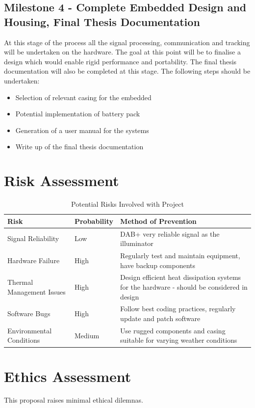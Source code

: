 \documentclass[12pt,a4paper]{article}
\begin{document}
\subsection{Milestone 4 - Complete Embedded Design and Housing, Final Thesis Documentation} 
At this stage of the process all the signal processing, communication and tracking will be undertaken on the hardware. The goal at this point will be to finalise a design which would enable rigid performance and portability. The final thesis documentation will also be completed at this stage. The following steps should be undertaken:
\begin{multicols}{2}
    \begin{itemize}
    \item Selection of relevant casing for the embedded
    \item Potential implementation of battery pack
    \item Generation of a user manual for the systems
    \item Write up of the final thesis documentation
    \end{itemize} 
\end{multicols}

\newpage
\section{Risk Assessment}

\begin{table}[htbp]
    \centering
    \caption{Potential Risks Involved with Project}
    \vspace{0.5cm}
    \begin{tabular}{|>{\raggedright\arraybackslash}p{3cm}|p{3cm}|p{6cm}|}
    \hline
    \rowcolor{gray!30} \textbf{Risk} & \textbf{Probability} & \textbf{Method of Prevention} \\
    \hline
    Signal Reliability & Low & DAB+ very reliable signal as the illuminator \\
    \hline
    Hardware Failure & High & Regularly test and maintain equipment, have backup components \\
    \hline
    Thermal Management Issues & High & Design efficient heat dissipation systems for the hardware - should be considered in design \\
    \hline
    Software Bugs & High & Follow best coding practices, regularly update and patch software \\
    \hline
    Environmental Conditions & Medium & Use rugged components and casing suitable for varying weather conditions \\
    \hline
    \end{tabular}
    \label{table:risks}
    \end{table}
    

\section{Ethics Assessment}
This proposal raises minimal ethical dilemnas.

\newpage


\end{document}
